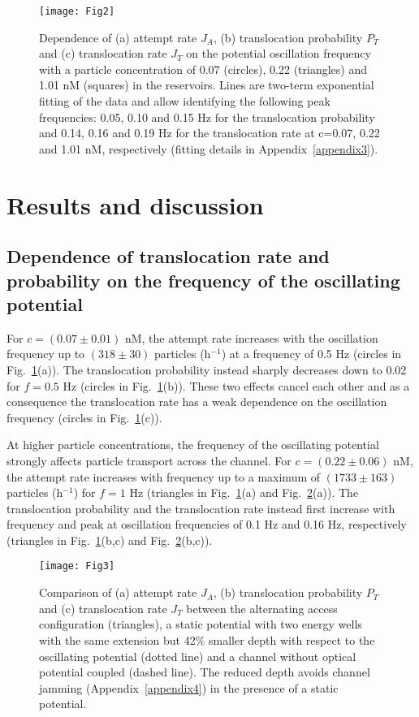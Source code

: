 \documentclass[
 reprint,
 aps, showkeys, showpacs
]{revtex4-1}
\begin{document}
\begin{figure}
\texttt{[image: Fig2]}
\caption{\label{Fig2} Dependence of (a) attempt rate $J_A$, (b) translocation probability $P_T$ and (c) translocation rate $J_T$ on the potential oscillation frequency with a particle concentration of 0.07 (circles), 0.22 (triangles) and 1.01 nM (squares) in the reservoirs. Lines are two-term exponential fitting of the data and allow identifying the following peak frequencies: 0.05, 0.10 and 0.15 Hz for the translocation probability and 0.14, 0.16 and 0.19 Hz for the translocation rate at c=0.07, 0.22 and 1.01 nM, respectively (fitting details in Appendix~\ref{appendix3}).} 
\end{figure}

\section{Results and discussion}
\subsection{Dependence of translocation rate and probability on the frequency of the oscillating potential}
For $c = (0.07\pm0.01)$ nM, the attempt rate increases with the oscillation frequency up to $(318\pm30)$ particles (h$^{-1}$) at a frequency of 0.5 Hz (circles in Fig.~\ref{Fig2}(a)). The translocation probability instead sharply decreases down to 0.02 for $f=0.5$ Hz (circles in Fig.~\ref{Fig2}(b)). These two effects cancel each other and as a consequence the translocation rate has a weak dependence on the oscillation frequency (circles in Fig.~\ref{Fig2}(c)).

At higher particle concentrations, the frequency of the oscillating potential strongly affects particle transport across the channel. For $c=(0.22\pm0.06)$ nM, the attempt rate increases with frequency up to a maximum of $(1733\pm163)$ particles (h$^{-1}$) for $f=1$ Hz (triangles in Fig.~\ref{Fig2}(a) and Fig.~\ref{Fig3}(a)). The translocation probability and the translocation rate instead first increase with frequency and peak at oscillation frequencies of 0.1 Hz and 0.16 Hz, respectively (triangles in Fig.~\ref{Fig2}(b,c) and Fig.~\ref{Fig3}(b,c)). 

\begin{figure}
\texttt{[image: Fig3]}
\caption{\label{Fig3} Comparison of (a) attempt rate $J_A$, (b) translocation probability $P_T$ and (c) translocation rate $J_T$ between the alternating access configuration (triangles), a static potential with two energy wells with the same extension but 42\% smaller depth with respect to the oscillating potential (dotted line) and a channel without optical potential coupled (dashed line). The reduced depth avoids channel jamming (Appendix~\ref{appendix4}) in the presence of a static potential.}
\end{figure}
\end{document}
